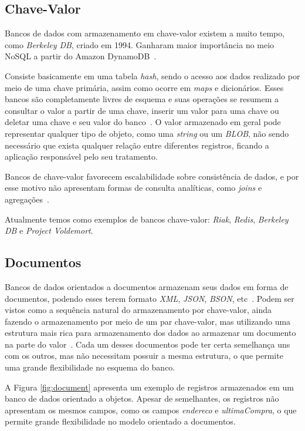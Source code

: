 \subsection*{Chave-Valor}
Bancos de dados com armazenamento em chave-valor existem a muito tempo, como \emph{Berkeley DB}, criado em 1994. Ganharam maior importância no meio NoSQL a partir do Amazon DynamoDB~\cite{chrisnosql}.

Consiste basicamente em uma tabela \emph{hash}, sendo o acesso aos dados realizado por meio de uma chave primária, assim como ocorre em \emph{maps} e dicionários.  Esses bancos são completamente livres de esquema e suas operações se resumem a consultar o valor a partir de uma chave, inserir um valor para uma chave ou deletar uma chave e seu valor do banco~\cite{nosqleval}. O valor armazenado em geral pode representar qualquer tipo de objeto, como uma \emph{string} ou um \emph{BLOB}, não sendo necessário que exista qualquer relação entre diferentes registros, ficando a aplicação responsável pelo seu tratamento. 

Bancos de chave-valor favorecem escalabilidade sobre consistência de dados, e por esse motivo não apresentam formas de consulta analíticas, como \emph{joins} e agregações~\cite{chrisnosql}.

Atualmente temos como exemplos de bancos chave-valor: \emph{Riak}, \emph{Redis}, \emph{Berkeley DB} e \emph{Project Voldemort}.

\subsection*{Documentos}
Bancos de dados orientados a documentos armazenam seus dados em forma de documentos, podendo esses terem formato \emph{XML}, \emph{JSON}, \emph{BSON}, etc~\cite{pramod}. Podem ser vistos como a sequência natural do armazenamento por chave-valor, ainda fazendo o armazenamento por meio de um par chave-valor, mas utilizando uma estrutura mais rica para armazenamento dos dados ao armazenar um documento na parte do valor~\cite{chrisnosql}. Cada um desses documentos pode ter certa semelhança uns com os outros, mas não necessitam possuir a mesma estrutura, o que permite uma grande flexibilidade no esquema do banco.

A Figura \ref{fig:document} apresenta um exemplo de registros armazenados em um banco de dados orientado a objetos. Apesar de semelhantes, os registros não apresentam os mesmos campos, como os campos \emph{endereco} e \emph{ultimaCompra}, o que permite grande flexibilidade no modelo orientado a documentos. 

